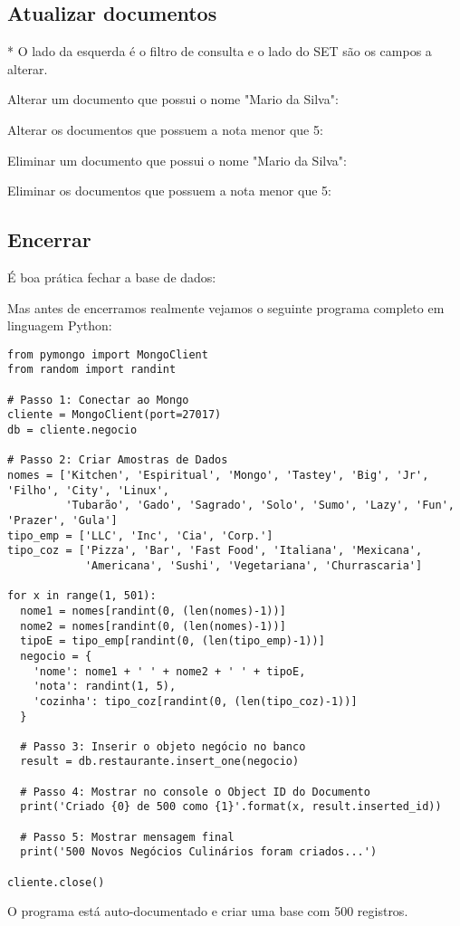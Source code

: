 \subsection{Atualizar documentos}
* O lado da esquerda é o filtro de consulta e o lado do SET são os campos a alterar.

Alterar um documento que possui o nome "Mario da Silva": \\

Alterar os documentos que possuem a nota menor que 5: \\

Eliminar um documento que possui o nome "Mario da Silva": \\

Eliminar os documentos que possuem a nota menor que 5: \\

\subsection{Encerrar}
É boa prática fechar a base de dados: \\

Mas antes de encerramos realmente vejamos o seguinte programa completo em linguagem Python:

\begin{lstlisting}[]
from pymongo import MongoClient
from random import randint

# Passo 1: Conectar ao Mongo
cliente = MongoClient(port=27017)
db = cliente.negocio

# Passo 2: Criar Amostras de Dados
nomes = ['Kitchen', 'Espiritual', 'Mongo', 'Tastey', 'Big', 'Jr', 'Filho', 'City', 'Linux',
         'Tubarão', 'Gado', 'Sagrado', 'Solo', 'Sumo', 'Lazy', 'Fun', 'Prazer', 'Gula']
tipo_emp = ['LLC', 'Inc', 'Cia', 'Corp.']
tipo_coz = ['Pizza', 'Bar', 'Fast Food', 'Italiana', 'Mexicana',
            'Americana', 'Sushi', 'Vegetariana', 'Churrascaria']

for x in range(1, 501):
  nome1 = nomes[randint(0, (len(nomes)-1))]
  nome2 = nomes[randint(0, (len(nomes)-1))]
  tipoE = tipo_emp[randint(0, (len(tipo_emp)-1))]
  negocio = {
	'nome': nome1 + ' ' + nome2 + ' ' + tipoE,
	'nota': randint(1, 5),
	'cozinha': tipo_coz[randint(0, (len(tipo_coz)-1))]
  }  

  # Passo 3: Inserir o objeto negócio no banco
  result = db.restaurante.insert_one(negocio)

  # Passo 4: Mostrar no console o Object ID do Documento
  print('Criado {0} de 500 como {1}'.format(x, result.inserted_id))

  # Passo 5: Mostrar mensagem final
  print('500 Novos Negócios Culinários foram criados...')

cliente.close()
\end{lstlisting}

O programa está auto-documentado e criar uma base com 500 registros.